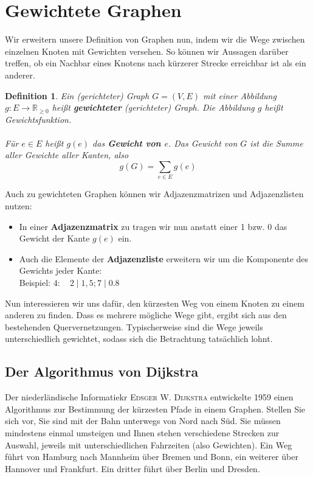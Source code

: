 \documentclass[11pt,a4paper]{scrartcl}
\newtheorem{definition}{Definition}
\begin{document}
\section{Gewichtete Graphen}
Wir erweitern unsere Definition von Graphen nun, indem wir die Wege zwischen einzelnen Knoten mit Gewichten versehen. So können wir Aussagen darüber treffen, ob ein Nachbar eines Knotens nach kürzerer Strecke erreichbar ist als ein anderer.
\begin{definition}
Ein (gerichteter) Graph $G = (V, E)$ mit einer Abbildung $g: E \to \mathbb{R}_{\geq 0}$ heißt \textbf{gewichteter} (gerichteter) Graph. Die Abbildung $g$ heißt Gewichtsfunktion. \\\\
Für $e \in E$ heißt $g(e)$ das \textbf{Gewicht von $e$}. Das Gewicht von $G$ ist die Summe aller Gewichte aller Kanten, also 
\[g(G) = \sum_{e \in E} g(e)\]
\end{definition}
Auch zu gewichteten Graphen können wir Adjazenzmatrizen und Adjazenzlisten nutzen:
\begin{itemize}
\item In einer \textbf{Adjazenzmatrix} zu tragen wir nun anstatt einer 1 bzw. 0 das Gewicht der Kante $g(e)$ ein.
\item Auch die Elemente der \textbf{Adjazenzliste} erweitern wir um die Komponente des Gewichts jeder Kante: \\
Beispiel: $4: \quad 2 \mid 1,5; 7 \mid 0.8$
\end{itemize}
Nun interessieren wir uns dafür, den kürzesten Weg von einem Knoten zu einem anderen zu finden. Dass es mehrere mögliche Wege gibt, ergibt sich aus den bestehenden Quervernetzungen. Typischerweise sind die Wege jeweils unterschiedlich gewichtet, sodass sich die Betrachtung tatsächlich lohnt. 
\subsection{Der Algorithmus von Dijkstra}
Der niederländische Informatiekr \textsc{Edsger W. Dijkstra} entwickelte 1959 einen Algorithmus zur Bestimmung der kürzesten Pfade in einem Graphen. Stellen Sie sich vor, Sie sind mit der Bahn unterwegs von Nord nach Süd. Sie müssen mindestens einmal umsteigen und Ihnen stehen verschiedene Strecken zur Auswahl, jeweils mit unterschiedlichen Fahrzeiten (also Gewichten). Ein Weg führt von Hamburg nach Mannheim über Bremen und Bonn, ein weiterer über Hannover und Frankfurt. Ein dritter führt über Berlin und Dresden.
\end{document}
